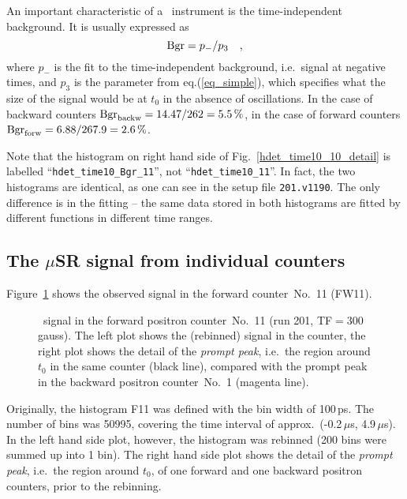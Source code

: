 \documentclass[twoside]{dis04}
\begin{document}
An important characteristic of a \musr\ instrument is the time-independent 
background.  It is usually expressed as
%
\begin{equation}
{\rm Bgr} = p_{-} / p_3 ~~~,
\label{eq_background}
\end{equation}
%
where $p_{-}$ is the fit to the time-independent background, i.e.\ signal at negative times, 
and $p_3$ is the parameter from eq.(\ref{eq_simple}), which specifies what the
size of the signal would be at $t_0$ in the absence of oscillations.
In the case of backward counters ${\rm Bgr}_{\rm backw} = 14.47/262 = 5.5\,\%$,
in the case of forward counters ${\rm Bgr}_{\rm forw} = 6.88/267.9 = 2.6\,\%$.

Note that the histogram on right hand side of Fig.~\ref{hdet_time10_10_detail}
is labelled ``{\tt hdet\_time10\_Bgr\_11}'', not ``{\tt hdet\_time10\_11}''.
In fact, the two histograms are identical, as one can see in the setup file
{\tt 201.v1190}.  The only difference is in the fitting -- the same data stored in
both histograms are fitted by different functions in different time ranges.


\subsection{The $\mu$SR signal from individual counters}
%
Figure~\ref{F11} shows the observed signal in the
forward counter\ No.~11 (FW11).
%
\begin{figure}[htbp]\centering
{}
\caption{\musr\ signal in the forward positron counter\ No.~11 (run 201, TF$=300\,$gauss).
The left plot shows the (rebinned) signal in the counter,
the right plot shows the detail of the \emph{prompt peak}, i.e.\ the region 
around $t_0$ in the same counter (black line), 
compared with the prompt peak in the backward positron counter\ No.~1 (magenta line).}
\label{F11}
\end{figure}
%
Originally, the histogram F11 was defined with the bin width of 100\,ps.
The number of bins was 50995, covering the time interval of approx.\ (-0.2\,$\mu$s, 4.9\,$\mu$s).
In the left hand side plot, however, the histogram was rebinned 
(200 bins were summed up into 1 bin).
The right hand side plot shows the detail of the \emph{prompt peak}, i.e.\ the region 
around $t_0$, of one forward and one backward positron counters, prior to the rebinning.  
\end{document}
